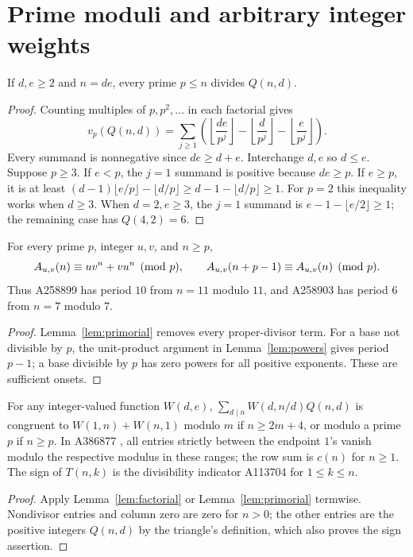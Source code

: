 \section{Prime moduli and arbitrary integer weights}
\begin{lemma}\label{lem:primorial}
If $d,e\geq2$ and $n=de$, every prime $p\leq n$ divides $Q(n,d)$.
\end{lemma}
\begin{proof}
Counting multiples of $p,p^2,\ldots$ in each factorial gives
\[
 v_p(Q(n,d))=\sum_{j\geq1}\left(\left\lfloor\frac{de}{p^j}\right\rfloor
 -\left\lfloor\frac d{p^j}\right\rfloor
 -\left\lfloor\frac e{p^j}\right\rfloor\right).
\]
Every summand is nonnegative since $de\geq d+e$.
Interchange $d,e$ so $d\leq e$. Suppose $p\geq3$.
If $e<p$, the $j=1$ summand is positive because $de\geq p$.
If $e\geq p$, it is at least
$(d-1)\lfloor e/p\rfloor-\lfloor d/p\rfloor
\geq d-1-\lfloor d/p\rfloor\geq1$.
For $p=2$ this inequality works when $d\geq3$.
When $d=2,e\geq3$, the $j=1$ summand is
$e-1-\lfloor e/2\rfloor\geq1$; the remaining case has $Q(4,2)=6$.
\end{proof}

\begin{corollary}\label{cor:prime}
For every prime $p$, integer $u,v$, and $n\geq p$,
\[
 A_{u,v}(n)\equiv uv^n+vu^n\pmod p,\qquad
 A_{u,v}(n+p-1)\equiv A_{u,v}(n)\pmod p.
\]
Thus A258899 has period $10$ from $n=11$ modulo $11$,
and A258903 has period $6$ from $n=7$ modulo $7$.
\end{corollary}
\begin{proof}
Lemma~\ref{lem:primorial} removes every proper-divisor term.
For a base not divisible by $p$, the unit-product argument in
Lemma~\ref{lem:powers} gives period $p-1$; a base divisible by $p$
has zero powers for all positive exponents. These are sufficient onsets.
\end{proof}

\begin{corollary}\label{cor:triangle}
For any integer-valued function $W(d,e)$,
$\sum_{d\mid n}W(d,n/d)Q(n,d)$ is congruent to
$W(1,n)+W(n,1)$ modulo $m$ if $n\geq2m+4$, or modulo a prime
$p$ if $n\geq p$. In A386877 \cite{a386877},
all entries strictly between the endpoint $1$'s vanish modulo
the respective modulus in these ranges; the row sum is $c(n)$ for $n\geq1$.
The sign of $T(n,k)$ is the divisibility indicator A113704 for $1\leq k\leq n$.
\end{corollary}
\begin{proof}
Apply Lemma~\ref{lem:factorial} or Lemma~\ref{lem:primorial} termwise.
Nondivisor entries and column zero are zero for $n>0$;
the other entries are the positive integers $Q(n,d)$ by the triangle's definition,
which also proves the sign assertion.
\end{proof}

